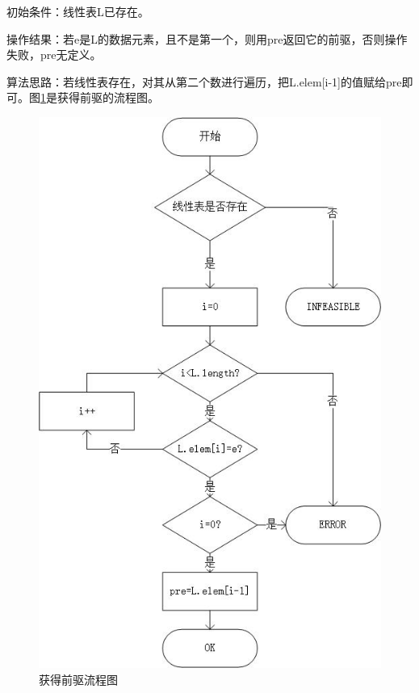 \documentclass[supercite]{Experimental_Report}
\theoremstyle{definition}
\begin{document}
初始条件：线性表L已存在。

操作结果：若e是L的数据元素，且不是第一个，则用pre返回它的前驱，否则操作失败，pre无定义。

算法思路：若线性表存在，对其从第二个数进行遍历，把L.elem[i-1]的值赋给pre即可。图\ref{fig1-8}是获得前驱的流程图。
\begin{figure}[htb] %
	\begin{center}
		\includegraphics[scale=0.9]{./images/顺序表/prior.jpg}
		\caption{获得前驱流程图}
		\label{fig1-8}
	\end{center}
\end{figure}

\newpage
\end{document}
